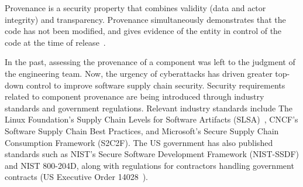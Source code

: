 \documentclass{IEEEcsmagTechrxiv}
\begin{document}

Provenance is a security property that combines validity (data and actor integrity) and transparency.
Provenance simultaneously demonstrates that the code has not been modified, and gives evidence of the entity in control of the code at the time of release~\cite{okafor_sok, CooperNIST}.

In the past, assessing the provenance of a component was left to the judgment of the engineering team.
Now, the urgency of cyberattacks has driven greater top-down control to improve software supply chain security.
Security requirements related to component provenance are being introduced through industry standards and government regulations.
Relevant industry standards include
The Linux Foundation’s Supply Chain Levels for Software Artifacts (SLSA)~\cite{SLSA_SFM}, CNCF’s Software Supply Chain Best Practices,
  and Microsoft’s Secure Supply Chain Consumption Framework (S2C2F).
The US government has also published standards such as NIST’s Secure Software Development Framework (NIST-SSDF) and NIST 800-204D, along with regulations for contractors handling government contracts (US Executive Order 14028~\cite{EO14028}).
\end{document}
